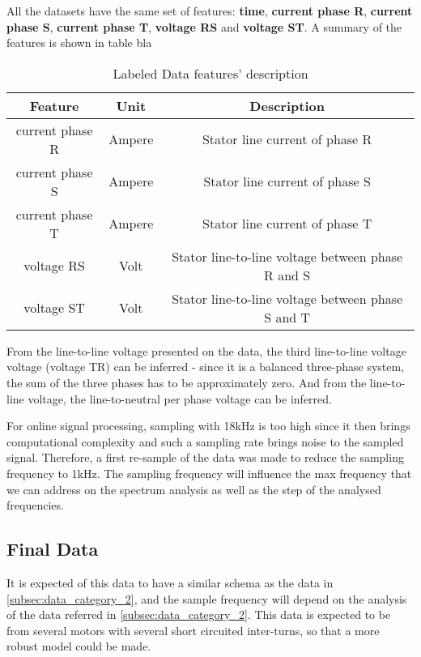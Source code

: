 All the datasets have the same set of features:  \textbf{time}, \textbf{current phase R}, \textbf{current phase S}, \textbf{current phase T}, \textbf{voltage RS} and \textbf{voltage ST}. A summary of the features is shown in table bla

\begin{table}[htpb]
\centering
\caption{Labeled Data features' description}
\label{my-label}
\begin{tabular}{@{}ccc@{}}
\toprule
\textbf{Feature} & \textbf{Unit} &                                                   \textbf{Description} \\ \midrule
current phase R  & Ampere        & Stator line current of phase R                    \\
current phase S  & Ampere        & Stator line current of phase S                    \\
current phase T  & Ampere        & Stator line current of phase T                    \\
voltage RS       & Volt          & Stator line-to-line voltage between phase R and S \\
voltage ST       & Volt          & Stator line-to-line voltage between phase S and T \\ \bottomrule
\end{tabular}
\end{table}


From the line-to-line voltage presented on the data, the third line-to-line voltage voltage (voltage TR) can be inferred - since it is a balanced three-phase system, the sum of the three phases has to be approximately zero. And from the line-to-line voltage, the line-to-neutral per phase voltage can be inferred.

For online signal processing, sampling with 18kHz is too high since it then brings computational complexity and such a sampling rate brings noise to the sampled signal. Therefore, a first re-sample of the data was made to reduce the sampling frequency to 1kHz. The sampling frequency will influence the max frequency that we can address on the spectrum analysis as well as the step of the analysed frequencies.

\subsection{Final Data}
\label{subsec:data_category_3}

It is expected of this data to have a similar schema as the data in \ref{subsec:data_category_2}, and the sample frequency will depend on the analysis of the data referred in \ref{subsec:data_category_2}. This data is expected to be from several motors with several short circuited inter-turns, so that a more robust model could be made.